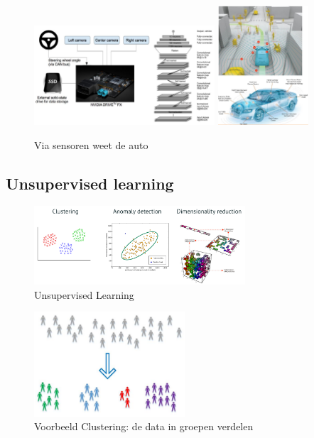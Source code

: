 \documentclass{article}
\begin{document}
\begin{figure}[H]
    \centering
    \includegraphics[width=0.6\textwidth]{stuurhoek-selfdriving-car.png}
    \includegraphics[width=0.3\textwidth]{stuurhoek-selfdriving-car2.png}
    \caption{Via sensoren weet de auto }
\end{figure}



\subsection{Unsupervised learning}

\begin{figure}[H]
    \centering
    \includegraphics[width=0.7\textwidth]{unsupervised-learning.png}
    \caption{Unsupervised Learning}
\end{figure}

\begin{figure}[H]
    \centering
    \includegraphics[width=0.5\textwidth]{unsupervised-learning2.png}
    \caption{Voorbeeld Clustering: de data in groepen verdelen}
\end{figure}
\end{document}
